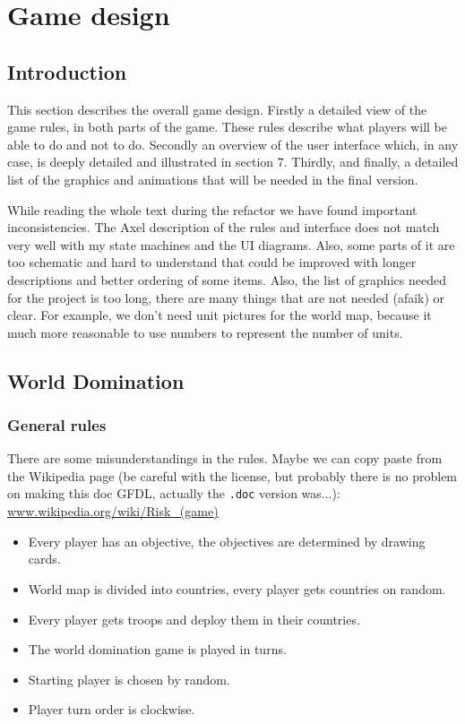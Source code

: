 \documentclass[12pt,a4paper]{article}
\let\stdsection\section
\renewcommand\section{\newpage\stdsection}
\begin{document}
\section{Game design}

\subsection{Introduction}

This section describes the overall game design. Firstly a detailed view
of the game rules, in both parts of the game. These rules describe what
players will be able to do and not to do. Secondly an overview of the
user interface which, in any case, is deeply detailed and illustrated in
section 7. Thirdly, and finally, a detailed list of the graphics and 
animations that will be needed in the final version.

\begin{todo}
  While reading the whole text during the refactor we have found
  important inconsistencies. The Axel description of the rules and
  interface does not match very well with my state machines and the UI
  diagrams. Also, some parts of it are too schematic and hard to
  understand that could be improved with longer descriptions and
  better ordering of some items. Also, the list of graphics needed for
  the project is too long, there are many things that are not needed
  (afaik) or clear. For example, we don't need unit pictures for the
  world map, because it much more reasonable to use numbers to
  represent the number of units.
\end{todo}

\subsection{World Domination}

\subsubsection{General rules}

\begin{todo}
  There are some misunderstandings in the rules. Maybe we can copy paste
  from the Wikipedia page (be careful with the license, but probably
  there is no problem on making this doc GFDL, actually the
  \texttt{.doc} version was...):
  \url{www.wikipedia.org/wiki/Risk_(game)}
\end{todo}

\begin{itemize}
\item Every player has an objective, the objectives are determined by
  drawing cards.
\item World map is divided into countries, every player gets countries
  on random.
\item Every player gets troops and deploy them in their countries.
\item The world domination game is played in turns.
\item Starting player is chosen by random.
\item Player turn order is clockwise.
\end{itemize}
\end{document}

